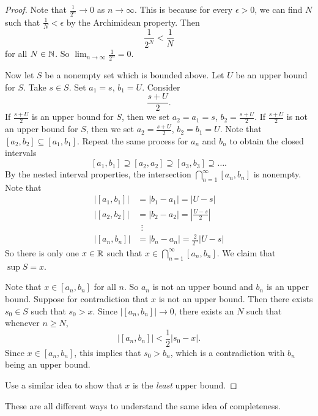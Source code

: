\begin{proof}
  Note that $\frac{1}{2^n} \to 0$ as $n \to \infty$.
  This is because for
  every $\epsilon > 0$, we can find $N$ such that
  $\frac{1}{N} < \epsilon$ by the Archimidean property.
  Then
  \[
    \frac{1}{2^N} < \frac{1}{N}
  \]
  for all $N \in \mathbb{N}$. So
  $\lim_{n \to \infty} \frac{1}{2^n} = 0$.

  Now let $S$ be a nonempty set which is bounded above.
  Let $U$ be an upper bound for $S$. Take $s \in S$.
  Set $a_1 = s$, $b_1 = U$. Consider
  \[
    \frac{s + U}{2}
  .\]
  If $\frac{s + U}{2}$ is an upper bound for $S$, then
  we set $a_2 = a_1 = s$, $b_2 = \frac{s + U}{2}$. If
  $\frac{s + U}{2}$ is not an upper bound for $S$, then
  we set $a_2 = \frac{s + U}{2}$, $b_2 = b_1 = U$.
  Note that $[a_2, b_2] \subseteq [a_1, b_1]$.
  Repeat the same process for $a_n$ and $b_n$ to
  obtain the closed intervals
  \[[a_1, b_1] \supseteq [a_2, a_2] \supseteq [a_3, b_3] \supseteq \dots.\]
  By the nested interval properties, the intersection
  $\bigcap_{n = 1}^\infty [a_n, b_n]$ is nonempty.
  Note that
  \begin{align*}
    \left|[a_1, b_1]\right| &= |b_1 - a_1| = |U - s| \\
    \left|[a_2, b_2]\right| &= |b_2 - a_2| = \left|\frac{U - s}{2}\right| \\
                            &\ \ \vdots \\
    \left|[a_n, b_n]\right| &= |b_n - a_n| = \frac{2}{2^n}|U - s|
  \end{align*}
  So there is only one $x \in \mathbb{R}$ such that
  $x \in \bigcap_{n = 1}^\infty [a_n, b_n]$. We claim
  that $\sup S = x$.

  Note that $x \in [a_n, b_n]$ for all $n$. So
  $a_n$ is not an upper bound and $b_n$ is an upper bound.
  Suppose for contradiction that $x$ is not an upper bound.
  Then there exists $s_0 \in S$ such that $s_0 > x$.
  Since $|[a_n, b_n]| \to 0$, there exists an $N$ such
  that whenever $n \ge N$,
  \[
    |[a_n, b_n]| < \frac{1}{2}|s_0 - x|
  .\]
  Since $x \in [a_n, b_n]$, this implies that $s_0 > b_n$,
  which is a contradiction with $b_n$ being an upper bound.

  Use a similar idea to show that $x$ is the \textit{least}
  upper bound.
\end{proof}

\begin{remark}
  These are all different ways to understand the
  same idea of completeness.
\end{remark}
